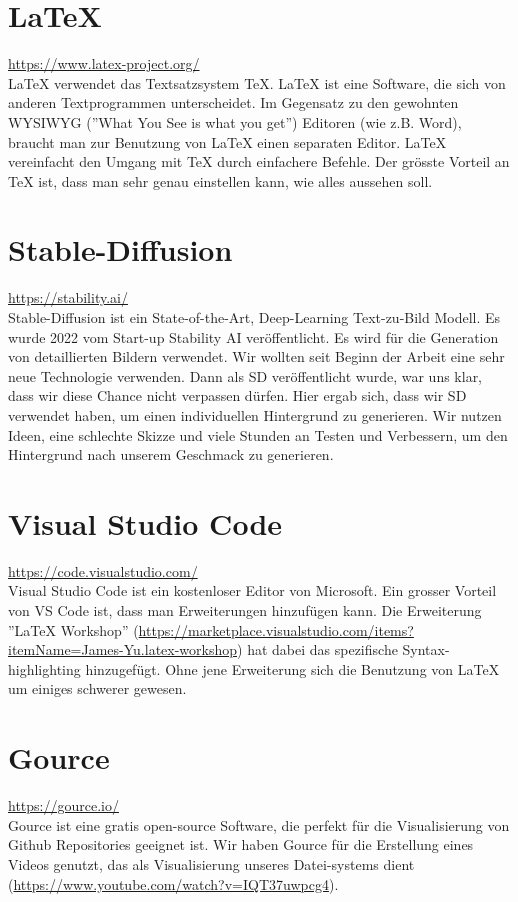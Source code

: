 \section{LaTeX}
\url{https://www.latex-project.org/}\\
LaTeX verwendet das Textsatzsystem TeX. LaTeX ist eine Software, die sich von anderen Textprogrammen unterscheidet. Im Gegensatz zu den gewohnten WYSIWYG (''What You See is what you get'') Editoren (wie z.B. Word),
braucht man zur Benutzung von LaTeX einen separaten Editor. LaTeX vereinfacht den Umgang mit TeX durch einfachere Befehle. Der grösste Vorteil an TeX ist, dass man sehr genau einstellen kann, wie alles aussehen soll.


\section{Stable-Diffusion}
\url{https://stability.ai/}\\
Stable-Diffusion ist ein State-of-the-Art, Deep-Learning Text-zu-Bild Modell. Es wurde 2022 vom Start-up Stability AI veröffentlicht. Es wird für die Generation von detaillierten Bildern verwendet. Wir wollten seit
Beginn der Arbeit eine sehr neue Technologie verwenden. Dann als SD veröffentlicht wurde, war uns klar, dass wir diese Chance nicht verpassen dürfen. Hier ergab sich, dass wir SD verwendet haben, um einen individuellen
Hintergrund zu generieren. Wir nutzen Ideen, eine schlechte Skizze und viele Stunden an Testen und Verbessern, um den Hintergrund nach unserem Geschmack zu generieren.

\section{Visual Studio Code}
\url{https://code.visualstudio.com/}\\
Visual Studio Code ist ein kostenloser Editor von Microsoft. Ein grosser Vorteil von VS Code ist, dass man Erweiterungen hinzufügen kann. Die Erweiterung ''LaTeX Workshop'' (\url{https://marketplace.visualstudio.com/items?itemName=James-Yu.latex-workshop})
hat dabei das spezifische Syntax-highlighting hinzugefügt. Ohne jene Erweiterung sich die Benutzung von LaTeX um einiges schwerer gewesen.

\section{Gource}
\url{https://gource.io/}\\
Gource ist eine gratis open-source Software, die perfekt für die Visualisierung von Github Repositories geeignet ist. Wir haben Gource für die Erstellung eines Videos genutzt, das als Visualisierung unseres Datei-systems
dient (\url{https://www.youtube.com/watch?v=IQT37uwpcg4}).

